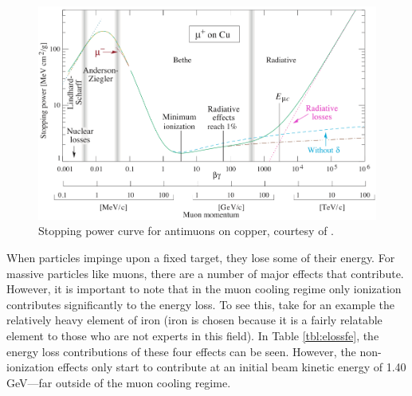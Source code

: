 \begin{figure}
  \centering
    \includegraphics[width=\textwidth]{Figures/bethecurve} 
  \caption{Stopping power curve for antimuons on copper, courtesy of \cite{PDG}. }
  \label{fig:bethecurve}
\end{figure}

When particles impinge upon a fixed target, they lose some of their energy. For massive particles like muons, there are a number of major effects that contribute. However, it is important to note that in the muon cooling regime only ionization contributes significantly to the energy loss. To see this, take for an example the relatively heavy element of iron (iron is chosen because it is a fairly relatable element to those who are not experts in this field). In Table \ref{tbl:elossfe}, the energy loss contributions of these four effects can be seen. However, the non-ionization effects only start to contribute at an initial beam kinetic energy of 1.40 GeV---far outside of the muon cooling regime.

